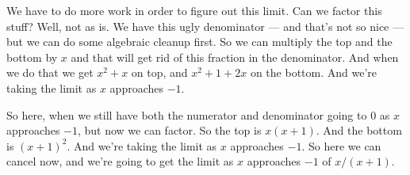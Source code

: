 \documentclass[pdftex, brazil, 12pt, twoside]{article}
\begin{document}
\begin{figure}[H]
  \begin{center}
  \end{center}
\end{figure}

We have to do more work in order to figure out this limit.
Can we factor this stuff?
Well, not as is.
We have this ugly denominator --- and that's not so nice ---
but we can do some algebraic cleanup first.
So we can multiply the top and the bottom
by $x$ and that will get rid of this fraction
in the denominator.
And when we do that we get $x^2 + x$ on top,
and $x^2 + 1 + 2x$ on the bottom.
And we're taking the limit as $x$ approaches $-1$.

\begin{figure}[H]
  \begin{center}
  \end{center}
\end{figure}

So here, when we still have both the numerator and denominator
going to $0$ as $x$ approaches $-1$, but now we can factor.
So the top is $x(x + 1)$.
And the bottom is $(x + 1)^2$.
And we're taking the limit as $x$ approaches $-1$.
So here we can cancel now, and we're
going to get the limit as $x$ approaches $-1$
of $x/(x + 1)$.

\begin{figure}[H]
  \begin{center}
  \end{center}
\end{figure}
\end{document}
